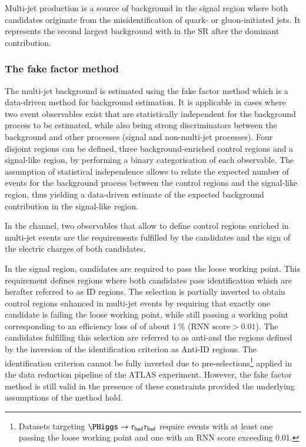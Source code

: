 \label{sec:hadhad_multijet}

Multi-jet production is a source of background in the \hadhad signal
region where both \tauhadvis candidates originate from the
misidentification of quark- or gluon-initiated jets. It represents the
second largest background with \faketauhadvis in the \hadhad SR after
the dominant \ttbarFakes contribution.

\subsubsection{The fake factor method}

The multi-jet background is estimated using the fake factor method
which is a data-driven method for background estimation. It is
applicable in cases where two event observables exist that are
statistically independent for the background process to be estimated,
while also being strong discriminators between the background and
other processes (signal and non-multi-jet processes). Four disjoint
regions can be defined, three background-enriched control regions and
a signal-like region, by performing a binary categorisation of each
observable. The assumption of statistical independence allows to
relate the expected number of events for the background process
between the control regions and the signal-like region, thus yielding
a data-driven estimate of the expected background contribution in the
signal-like region.

In the \hadhad channel, two observables that allow to define control
regions enriched in multi-jet events are the \tauid requirements
fulfilled by the \tauhadvis candidates and the sign of the electric
charges of both candidates.

In the signal region, \tauhadvis candidates are required to pass the
loose \tauid working point. This requirement defines regions where
both \tauhadvis candidates pass identification which are herafter
referred to as ID regions. The selection is partially inverted to
obtain control regions enhanced in multi-jet events by requiring that
exactly one \tauhadvis candidate is failing the loose \tauid working
point, while still passing a working point corresponding to an
efficiency loss of \tauhad of about 1\,\% ($\text{RNN score} >
0.01$). The \tauhadvis candidates fulfilling this selection are
referred to as anti-\tauhadvis and the regions defined by the
inversion of the identification criterion as Anti-ID regions. The
identification criterion cannot be fully inverted due to
pre-selections\footnote{Datasets targeting $\PHiggs \to \hadhad$
  require events with at least one \tauhadvis passing the loose \tauid
  working point and one \tauhadvis with an RNN \tauid score exceeding
  0.01.} applied in the data reduction pipeline of the ATLAS
experiment. However, the fake factor method is still valid in the
presence of these constraints provided the underlying assumptions of
the method hold.

